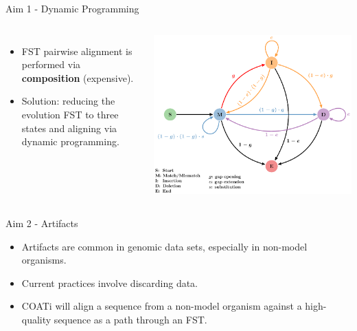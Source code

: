 \documentclass[aspectratio=169]{beamer}
\begin{document}
\begin{frame}{Aim 1 - Dynamic Programming} %
\begin{columns}
\begin{itemize}
	\setlength\itemsep{1em}
	\item FST pairwise alignment is performed via \textbf{composition}
		(expensive).
	\item Solution: reducing the evolution FST to three states and aligning via
		dynamic programming.
\end{itemize}
\vspace{-0.75em}
\includegraphics[scale=0.55,center]{fig-dp-model.pdf}
\end{columns}
\end{frame} %

\begin{frame}{Aim 2 - Artifacts} %
\justify
\begin{itemize}
	\setlength\itemsep{1em}
	\item Artifacts are common in genomic data sets, especially in non-model
		organisms.
	\item Current practices involve discarding data.
	\item COATi will align a sequence from a non-model organism against a
		high-quality sequence as a path through an FST.
\end{itemize}
\end{frame} %
\end{document}
